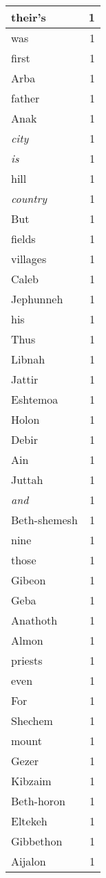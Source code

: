\begin{center}
\begin{longtable}{l|r}
their's & 1\\ \hline 
was & 1\\ \hline 
first & 1\\ \hline 
Arba & 1\\ \hline 
father & 1\\ \hline 
Anak & 1\\ \hline 
\emph{city} & 1\\ \hline 
\emph{is} & 1\\ \hline 
hill & 1\\ \hline 
\emph{country} & 1\\ \hline 
But & 1\\ \hline 
fields & 1\\ \hline 
villages & 1\\ \hline 
Caleb & 1\\ \hline 
Jephunneh & 1\\ \hline 
his & 1\\ \hline 
Thus & 1\\ \hline 
Libnah & 1\\ \hline 
Jattir & 1\\ \hline 
Eshtemoa & 1\\ \hline 
Holon & 1\\ \hline 
Debir & 1\\ \hline 
Ain & 1\\ \hline 
Juttah & 1\\ \hline 
\emph{and} & 1\\ \hline 
Beth-shemesh & 1\\ \hline 
nine & 1\\ \hline 
those & 1\\ \hline 
Gibeon & 1\\ \hline 
Geba & 1\\ \hline 
Anathoth & 1\\ \hline 
Almon & 1\\ \hline 
priests & 1\\ \hline 
even & 1\\ \hline 
For & 1\\ \hline 
Shechem & 1\\ \hline 
mount & 1\\ \hline 
Gezer & 1\\ \hline 
Kibzaim & 1\\ \hline 
Beth-horon & 1\\ \hline 
Eltekeh & 1\\ \hline 
Gibbethon & 1\\ \hline 
Aijalon & 1\\ \hline 

\end{longtable}
\end{center}
